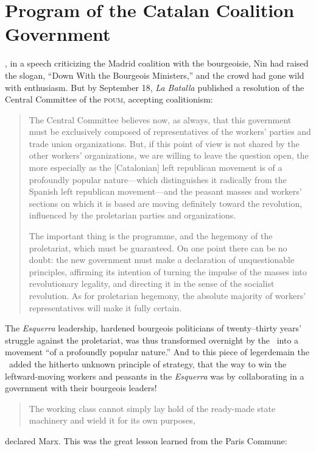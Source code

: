 \chapter{Program of the Catalan Coalition Government}

, in a speech criticizing the Madrid coalition with the bourgeoisie, Nin had raised the slogan, ``Down With the Bourgeois Ministers,'' and the crowd had gone wild with enthusiasm. But by September 18, \emph{La Batalla} published a resolution of the Central Committee of the \textsc{poum}, accepting coalitionism:

\begin{quotation}
  The Central Committee believes now, as always, that this government must be exclusively composed of representatives of the workers’ parties and trade union organizations. But, if this point of view is not shared by the other workers’ organizations, we are willing to leave the question open, the more especially as the [Catalonian] left republican movement is of a profoundly popular nature---which distinguishes it radically from the Spanish left republican movement---and the peasant masses and workers’ sections on which it is based are moving definitely toward the revolution, influenced by the proletarian parties and organizations.
  
  The important thing is the programme, and the hegemony of the proletariat, which must be guaranteed. On one point there can be no doubt: the new government must make a declaration of unquestionable principles, affirming its intention of turning the impulse of the masses into revolutionary legality, and directing it in the sense of the socialist revolution. As for proletarian hegemony, the absolute majority of workers’ representatives will make it fully certain.
\end{quotation}

The \emph{Esquerra} leadership, hardened bourgeois politicians of twenty--thirty years’ struggle against the proletariat, was thus transformed overnight by the \POUM\ into a movement ``of a profoundly popular nature.'' And to this piece of legerdemain the \POUM\ added the hitherto unknown principle of strategy, that the way to win the leftward-moving workers and peasants in the \emph{Esquerra} was by collaborating in a government with their bourgeois leaders!

\begin{quotation}
  The working class cannot simply lay hold of the ready-made state machinery and wield it for its own purposes,
\end{quotation}
declared Marx. This was the great lesson learned from the Paris Commune:

